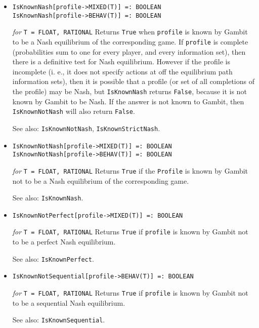 \begin{itemize}
\item
\protect \large \begin{verbatim}
IsKnownNash[profile->MIXED(T)] =: BOOLEAN
IsKnownNash[profile->BEHAV(T)] =: BOOLEAN
\end{verbatim}\normalsize

{\it for} {\tt T = FLOAT, RATIONAL}
\bd
Returns \verb+True+ when \verb+profile+
is known by Gambit to be a Nash equilibrium of the
corresponding game.  If \verb+profile+ is complete (probabilities sum to
one for every player, and every information set), then there is a
definitive test for Nash equilibrium.  However if the profile is
incomplete (i. e., it does not specify actions at off the equilibrium
path information sets), then it is possible that a profile (or set
of all completions of the profile) may be Nash, but \verb+IsKnownNash+
returns \verb+False+, because it is not known by Gambit to be Nash.
If the answer is not known to Gambit, then \verb+IsKnownNotNash+ will also
return \verb+False+.
\item [See also:] \verb+IsKnownNotNash+, \verb+IsKnownStrictNash+.
\ed

\item
\protect \large \begin{verbatim}
IsKnownNotNash[profile->MIXED(T)] =: BOOLEAN
IsKnownNotNash[profile->BEHAV(T)] =: BOOLEAN
\end{verbatim}\normalsize

{\it for} {\tt T = FLOAT, RATIONAL}
\bd 
Returns \verb+True+ if the \verb+Profile+
is known by Gambit not to be a Nash equilibrium of the
corresponding game.  
\item
[See also:] \verb+IsKnownNash+.
\ed

\item
\protect \large \begin{verbatim}
IsKnownNotPerfect[profile->MIXED(T)] =: BOOLEAN
\end{verbatim}\normalsize

{\it for} {\tt T = FLOAT, RATIONAL}
\bd
Returns \verb+True+ if \verb+profile+
is known by Gambit not to be a perfect Nash equilibrium.
\item [See also:] \verb+IsKnownPerfect+.
\ed

\item
\protect \large \begin{verbatim}
IsKnownNotSequential[profile->BEHAV(T)] =: BOOLEAN
\end{verbatim}\normalsize

{\it for} {\tt T = FLOAT, RATIONAL}
\bd
Returns \verb+True+ if \verb+profile+
is known by Gambit not to be a sequential Nash
equilibrium.
\item [See also:] \verb+IsKnownSequential+.
\ed


\end{itemize}
